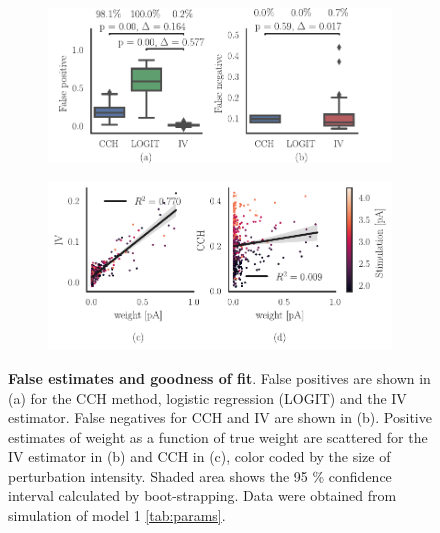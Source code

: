 \documentclass[11pt]{article}
\begin{document}
\begin{figure}
\makeatletter
\renewcommand\p@subfigure{}
\makeatother
\begin{subfigure}{\textwidth} 
\includegraphics[scale=1]{false_estimate}
\end{subfigure}

\medskip
\begin{subfigure}{\textwidth} 
\includegraphics[scale=1]{goodness_fit}
\end{subfigure}
\caption{{\bf False estimates and goodness of fit}. 
False positives are shown in (a) for the CCH method, logistic regression (LOGIT) and the IV estimator. 
False negatives for CCH and IV are shown in (b). 
Positive estimates of weight as a function of true weight are scattered for the IV estimator in (b) and CCH in (c), color coded by the size of perturbation intensity. 
Shaded area shows the 95 \% confidence interval calculated by boot-strapping. 
Data were obtained from simulation of model 1 \cref{tab:params}.
\label{fig:fitness}}
\end{figure}
\FloatBarrier
\end{document}
